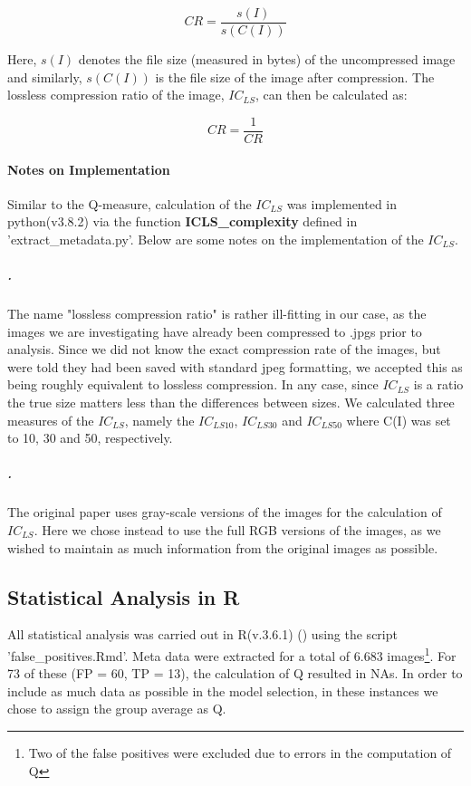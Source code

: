 \documentclass[12pt]{article}
\begin{document}
\begin{equation}
	CR = \frac{s(I)}{s(C(I))}
	\label{eq:CR1}
\end{equation} 

Here, $s(I)$ denotes the file size (measured in bytes) of the uncompressed image and similarly, $s(C(I))$ is the file size of the image after compression. The lossless compression ratio of the image, $IC_{LS}$, can then be calculated as:

\begin{equation}
	CR = \frac{1}{CR}
	\label{eq:CR2}
\end{equation} 

\paragraph{Notes on Implementation}
Similar to the Q-measure, calculation of the $IC_{LS}$ was implemented in python(v3.8.2) via the function \textbf{ICLS\_complexity} defined in 'extract\_metadata.py'. Below are some notes on the implementation of the $IC_{LS}$.
\subparagraph{.}
The name "lossless compression ratio" is rather ill-fitting in our case, as the images we are investigating have already been compressed to .jpgs prior to analysis. Since we did not know the exact compression rate of the images, but were told they had been saved with standard jpeg formatting, we accepted this as being roughly equivalent to lossless compression. In any case, since $IC_{LS}$ is a ratio the true size matters less than the differences between sizes. We calculated three measures of the $IC_{LS}$, namely the $IC_{LS10}$, $IC_{LS30}$ and $IC_{LS50}$ where C(I) was set to 10, 30 and 50, respectively.

\subparagraph{.}
The original paper uses gray-scale versions of the images for the calculation of $IC_{LS}$. Here we chose instead to use the full RGB versions of the images, as we wished to maintain as much information from the original images as possible.

\subsection{Statistical Analysis in R}\label{R}
All statistical analysis was carried out in R(v.3.6.1) (\cite{rcoreteamLanguageEnvironmentStatistical2020}) using the script 'false\_positives.Rmd'. Meta data were extracted for a total of 6.683 images\footnote{Two of the false positives were excluded due to errors in the computation of Q}. For 73 of these (FP = 60, TP = 13), the calculation of Q resulted in NAs. In order to include as much data as possible in the model selection, in these instances we chose to assign the group average as Q.
\end{document}
